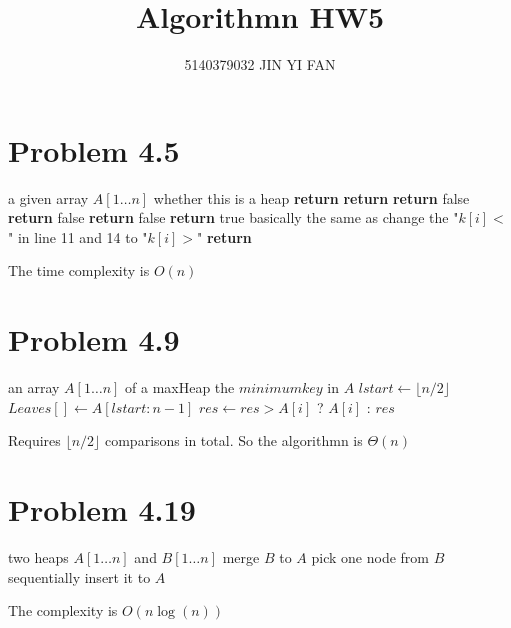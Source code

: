 \documentclass[a4paper]{article}
\title{\textbf{Algorithmn HW5}}
\author{5140379032 JIN YI FAN}
\date{}
\begin{document}
\maketitle
\begin{spacing}{1.3}
\section*{Problem 4.5}
\begin{algorithmic}[1]
\Require a given array $A[1\ldots n]$
\Ensure whether this is a heap
\State \textbf{return} 
\State \textbf{return} 
\Else \textbf{return} false
\EndIf
\EndFunction
{}
\State \textbf{return} false
\EndIf
{} 
\State \textbf{return} false
\EndIf
\State \textbf{return} true
\EndFor
\EndFunction
{}
\State basically the same as 
\State change the "$k[i]<$" in line 11 and 14 to "$k[i]>$"
\EndFunction
\State \textbf{return}  
\end{algorithmic}
The time complexity is $O(n)$

\section*{Problem 4.9}
\begin{algorithmic}[1]
\Require an array $A[1\ldots n]$ of a maxHeap
\Ensure the $minimum key$ in $A$
\State $lstart\gets \lfloor n/2\rfloor$
\State $Leaves[]\gets A[lstart:n-1]$
\State $res\gets res>A[i]$ ? $A[i]$ : $res$
\EndFor 
\end{algorithmic}
Requires $\lfloor n/2\rfloor$ comparisons in total. 
So the algorithmn is $\Theta(n)$

\section*{Problem 4.19}
\begin{algorithmic}[1]
\Require two heaps $A[1\ldots n]$ and $B[1\ldots n]$
\Ensure merge $B$ to $A$
\State pick one node from $B$ sequentially
\State insert it to $A$
\end{algorithmic}
The complexity is $O(n\log(n))$


\end{spacing}
\end{document}
